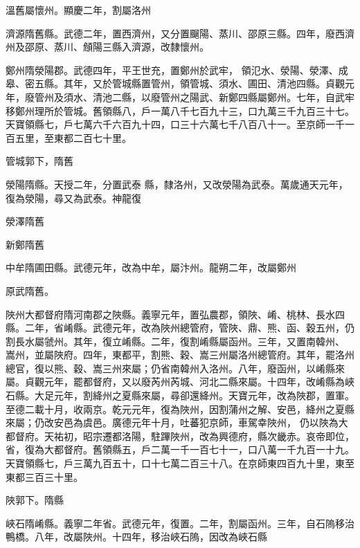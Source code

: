 \begin{pinyinscope}
 溫舊屬懷州。顯慶二年，割屬洛州



 濟源隋舊縣。武德二年，置西濟州，又分置飀陽、蒸川、邵原三縣。四年，廢西濟州及邵原、蒸川、頠陽三縣入濟源，改隸懷州。



 鄭州隋滎陽郡。武德四年，平王世充，置鄭州於武牢，
 領氾水、滎陽、滎澤、成皋、密五縣。其年，又於管城縣置管州，領管城、須水、圃田、清池四縣。貞觀元年，廢管州及須水、清池二縣，以廢管州之陽武、新鄭四縣屬鄭州。七年，自武牢移鄭州理所於管城。舊領縣八，戶一萬八千七百九十三，口九萬三千九百三十七。天寶領縣七，戶七萬六千六百九十四，口三十六萬七千八百八十一。至京師一千一百五里，至東都二百七十里。



 管城郭下，隋舊



 滎陽隋縣。天授二年，分置武泰
 縣，隸洛州，又改滎陽為武泰。萬歲通天元年，復為滎陽，尋又為武泰。神龍復



 滎澤隋舊



 新鄭隋舊



 中牟隋圃田縣。武德元年，改為中牟，屬汴州。龍朔二年，改屬鄭州



 原武隋舊。



 陜州大都督府隋河南郡之陜縣。義寧元年，置弘農郡，領陜、崤、桃林、長水四縣。二年，省崤縣。武德元年，改為陜州總管府，管陜、鼎、熊、函、穀五州，仍割長水屬虢州。其年，復立崤縣。二年，復割崤縣屬函州。三年，又置南韓州、
 嵩州，並屬陜府。四年，東都平，割熊、穀、嵩三州屬洛州總管府。其年，罷洛州總官，復以熊、穀、嵩三州來屬；仍省南韓州入洛州。八年，廢函州，以崤縣來屬。貞觀元年，罷都督府，又以廢芮州芮城、河北二縣來屬。十四年，改崤縣為峽石縣。大足元年，割絳州之夏縣來屬，尋卻還絳州。天寶元年，改為陜郡，置軍。至德二載十月，收兩京。乾元元年，復為陜州，因割蒲州之解、安邑，絳州之夏縣來屬；仍改安邑為虞邑。廣德元年十月，吐蕃犯京師，車駕幸陜州，
 仍以陜為大都督府。天祐初，昭宗遷都洛陽，駐蹕陜州，改為興德府，縣次畿赤。哀帝即位，省，復為大都督府。舊領縣五，戶二萬一千一百七十一，口八萬一千九百一十九。天寶領縣七，戶三萬九百五十，口十七萬二百三十八。在京師東四百九十里，東至東都三百三十里。



 陜郭下。隋縣



 峽石隋崤縣。義寧二年省。武德元年，復置。二年，割屬函州。三年，自石隖移治鴨橋。八年，改屬陜州。十四年，移治峽石隖，因改為峽石縣




\end{pinyinscope}
